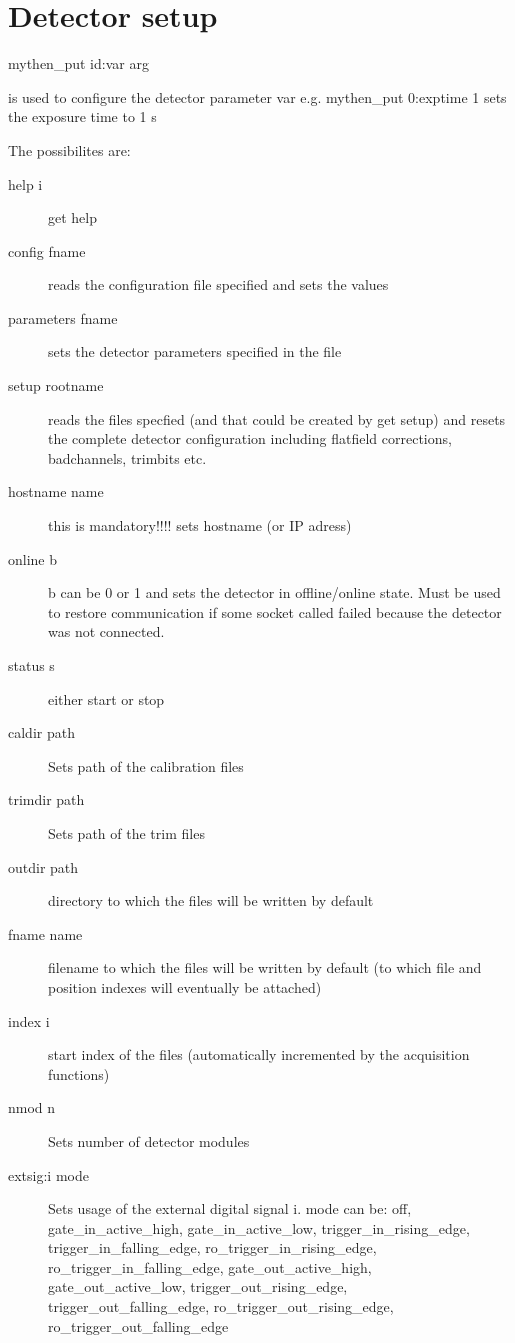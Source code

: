 \documentclass{report}
\begin{document}
\section{Detector setup}

mythen\_put id:var arg

is used to configure the detector parameter var
  e.g. mythen\_put 0:exptime 1 sets the exposure time to 1 s


The possibilites are:
\begin{description}
\item[help i]		get help
\item[config fname]     reads the configuration file specified and sets the values
\item[parameters fname] sets the detector parameters specified in the file
\item[setup rootname]  reads the files specfied (and that could be created by get setup) and resets the complete detector configuration including flatfield corrections, badchannels, trimbits etc.
\item[hostname name] 	this is mandatory!!!! sets hostname (or IP adress)
\item[online b] 	b can be 0 or 1 and sets the detector in offline/online state. Must be used to restore communication if some socket called failed because the detector was not connected.
\item[status s] 	either start or stop
\item[caldir path]  	Sets path of the calibration files 
\item[trimdir path] 	Sets path of the trim files
\item[outdir path]	directory to which the files will be written by default
\item[fname name] 	filename to which the files will be written by default (to which file and position indexes will eventually be attached)
\item[index i]  	start index of the files (automatically incremented by the acquisition functions)
\item[nmod n]  	Sets number of detector modules
\item[extsig:i mode]  	Sets usage of the external digital signal i. mode can be: off, gate\_in\_active\_high, gate\_in\_active\_low, trigger\_in\_rising\_edge, trigger\_in\_falling\_edge, ro\_trigger\_in\_rising\_edge, ro\_trigger\_in\_falling\_edge, gate\_out\_active\_high, gate\_out\_active\_low, trigger\_out\_rising\_edge, trigger\_out\_falling\_edge, ro\_trigger\_out\_rising\_edge, ro\_trigger\_out\_falling\_edge

\end{description}
\end{document}
